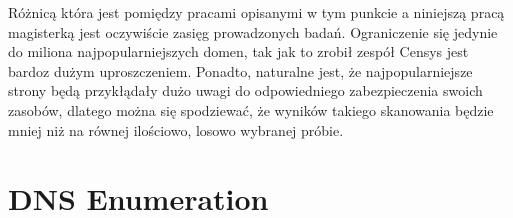 Różnicą która jest pomiędzy pracami opisanymi w tym punkcie a niniejszą pracą magisterką jest oczywiście zasięg prowadzonych badań. Ograniczenie się jedynie do miliona najpopularniejszych domen, tak jak to zrobił zespół Censys\cite{censys} jest bardoz dużym uproszczeniem. Ponadto, naturalne jest, że najpopularniejsze strony będą przykłądały dużo uwagi do odpowiedniego zabezpieczenia swoich zasobów, dlatego można się spodziewać, że wyników takiego skanowania będzie mniej niż na równej ilościowo, losowo wybranej próbie. 

\section{DNS Enumeration}
